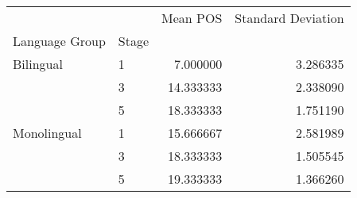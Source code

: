 \begin{tabular}{llrr}
\toprule
            &   &   Mean POS &  Standard Deviation \\
Language Group & Stage &            &                     \\
\midrule
Bilingual & 1 &   7.000000 &            3.286335 \\
            & 3 &  14.333333 &            2.338090 \\
            & 5 &  18.333333 &            1.751190 \\
Monolingual & 1 &  15.666667 &            2.581989 \\
            & 3 &  18.333333 &            1.505545 \\
            & 5 &  19.333333 &            1.366260 \\
\bottomrule
\end{tabular}

